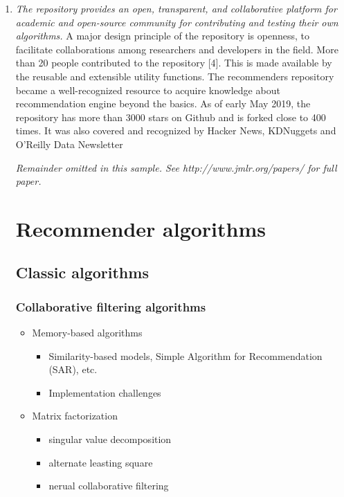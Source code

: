 \documentclass[twoside,11pt]{article}
\begin{document}
\begin{enumerate}
\item \emph{The repository provides an open, transparent, and collaborative platform for academic and open-source community for contributing and testing their own algorithms.} A major design principle of the repository is openness, to facilitate collaborations among researchers and developers in the field. More than 20 people contributed to the repository [4]. This is made available by the reusable and extensible utility functions. The recommenders repository became a well-recognized resource to acquire knowledge about recommendation engine beyond the basics. As of early May 2019, the repository has more than 3000 stars on Github and is forked close to 400 times. It was also covered and recognized by Hacker News, KDNuggets and O’Reilly Data Newsletter

{\noindent \em Remainder omitted in this sample. See http://www.jmlr.org/papers/ for full paper.}

\section{Recommender algorithms}

\subsection{Classic algorithms}
\subsubsection{Collaborative filtering algorithms}
\begin{itemize}
  \item Memory-based algorithms
    \begin{itemize}
      \item Similarity-based models, Simple Algorithm for Recommendation (SAR), etc.
      \item Implementation challenges
    \end{itemize}
  \item Matrix factorization
    \begin{itemize} 
      \item singular value decomposition
      \item alternate leasting square
      \item nerual collaborative filtering
    \end{itemize}

\end{itemize}
\end{enumerate}
\end{document}
